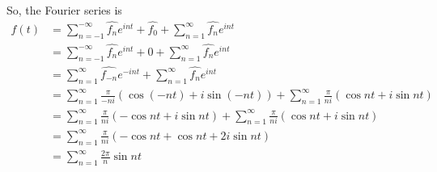 \documentclass[12pt, reqno]{amsart}
\theoremstyle{definition}
\theoremstyle{remark}
\begin{document}
\begin{itemize}
\begin{itemize}
\begin{itemize}
So, the Fourier series is \begin{align*}
f(t)&= \sum_{n=-1}^{-\infty}\hat{f_{n}}e^{int}+\hat{f_{0}}+\sum_{n=1}^{\infty}\hat{f_{n}}e^{int}\\
&= \sum_{n=-1}^{-\infty}\hat{f_{n}}e^{int}+0+\sum_{n=1}^{\infty}\hat{f_{n}}e^{int}\\
&=\sum_{n=1}^{\infty}\hat{f_{-n}}e^{-int}+\sum_{n=1}^\infty\hat{f_{n}}e^{int}\\
&=\sum_{n=1}^{\infty} \frac{\pi}{-ni}(\cos (-nt)+i\sin(-nt))+\sum_{n=1}^{\infty} \frac{\pi}{ni}(\cos nt+i\sin nt)\\
&=\sum_{n=1}^{\infty} \frac{\pi}{ni}(-\cos nt+i\sin nt)+\sum_{n=1}^{\infty} \frac{\pi}{ni}(\cos nt+i\sin nt)\\
&=\sum_{n=1}^{\infty} \frac{\pi}{ni}(-\cos nt+\cos nt +2i\sin nt)\\
&=\sum_{n=1}^{\infty} \frac{2\pi}{n}\sin nt
\end{align*}



\end{itemize}


\vspace{0.2 cm}

\end{itemize}





\end{itemize}
\end{document}
